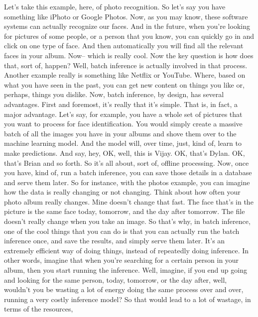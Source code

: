 {{{{{{{    Let's take this example, here, of photo recognition.
    So let's say you have something like iPhoto or Google Photos.
    Now, as you may know, these software systems
    can actually recognize our faces.
    And in the future, when you're looking for pictures of some people,
    or a person that you know, you can quickly
    go in and click on one type of face.
    And then automatically you will find all the relevant faces in your album.
    Now-- which is really cool.
    Now the key question is how does that, sort of, happen?
    Well, batch inference is actually involved in that process.
    Another example really is something like Netflix or YouTube.
    Where, based on what you have seen in the past,
    you can get new content on things you like or, perhaps, things you dislike.
    Now, batch inference, by design, has several advantages.
    First and foremost, it's really that it's simple.
    That is, in fact, a major advantage.
    Let's say, for example, you have a whole set of pictures
    that you want to process for face identification.
    You would simply create a massive batch of all the images
    you have in your albums and shove them over to the machine learning model.
    And the model will, over time, just, kind of, learn to make predictions.
    And say, hey, OK, well, this is Vijay.
    OK, that's Dylan.
    OK, that's Brian and so forth.
    So it's all about, sort of, offline processing.
    Now, once you have, kind of, run a batch inference,
    you can save those details in a database and serve them later.
    So for instance, with the photos example,
    you can imagine how the data is really changing or not changing.
    Think about how often your photo album really changes.
    Mine doesn't change that fast.
    The face that's in the picture is the same face today, tomorrow,
    and the day after tomorrow.
    The file doesn't really change when you take an image.
    So that's why, in batch inference, one of the cool things that you can do
    is that you can actually run the batch inference once, and save the results,
    and simply serve them later.
    It's an extremely efficient way of doing things, instead of repeatedly doing
    inference.
    In other words, imagine that when you're searching
    for a certain person in your album, then you start running the inference.
    Well, imagine, if you end up going and looking for the same person, today,
    tomorrow, or the day after, well, wouldn't you
    be wasting a lot of energy doing the same process over and over,
    running a very costly inference model?
    So that would lead to a lot of wastage, in terms of the resources,
}}}}}}}
